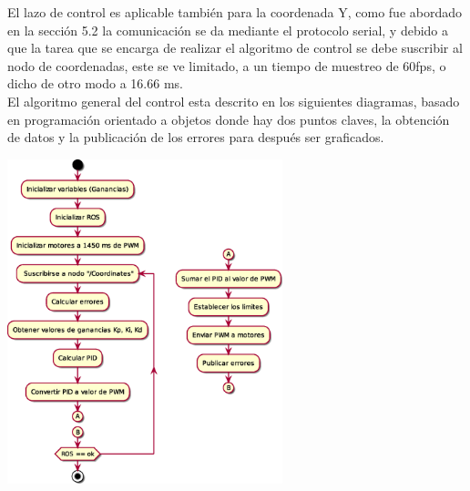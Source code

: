 El lazo de control es aplicable también para la coordenada Y, como fue abordado en la sección 5.2 la comunicación se da mediante
el protocolo serial, y debido a que la tarea que se encarga de realizar el algoritmo de control se debe suscribir al nodo de
coordenadas, este se ve limitado, a un tiempo de muestreo de 60fps, o dicho de otro modo a 16.66 ms.\\
El algoritmo general del control esta descrito en los siguientes diagramas, basado en programación orientado a objetos
donde hay dos puntos claves, la obtención de datos y la publicación de los errores para después ser graficados.
\begin{center}
	\includegraphics[width=0.6\textwidth]{Contenido/Cuerpo/Capitulo5/Fig7.eps}
	\label{Fig4}
\end{center}


